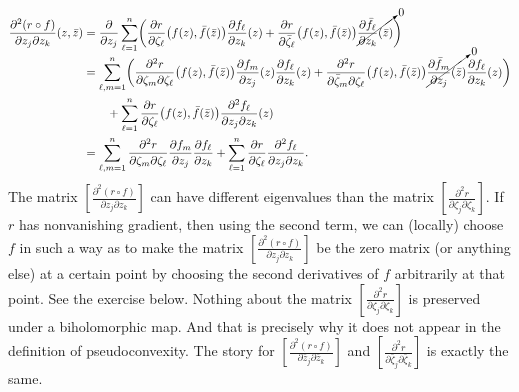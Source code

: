 \documentclass[12pt,openany]{book}
\theoremstyle{plain}
\theoremstyle{remark}
\theoremstyle{definition}
\theoremstyle{exercise}
\theoremstyle{example}
\begin{document}
\begin{equation*} %
\begin{split}
\frac{\partial^2 (r \circ f)}{\partial z_j \partial z_k} (z,\bar{z})
& =
\frac{\partial}{\partial z_j }
\sum_{\ell=1}^n 
\biggl(
\frac{\partial r}{\partial \zeta_\ell} \bigl(f(z),\bar{f}(\bar{z})\bigr)
\frac{\partial f_\ell}{\partial z_k} (z) 
+
\frac{\partial r}{\partial \bar{\zeta}_\ell} \bigl(f(z),\bar{f}(\bar{z})\bigr)
\cancelto{0}{\frac{\partial \bar{f}_\ell}{\partial z_k} (\bar{z})}
\biggr)
\\
& =
\sum_{\ell,m=1}^n 
\biggl(
\frac{\partial^2 r}{\partial \zeta_m \partial \zeta_\ell}
\bigl(f(z),\bar{f}(\bar{z})\bigr)
\frac{\partial f_m}{\partial z_j} (z) 
\frac{\partial f_\ell}{\partial z_k} (z) 
+
\frac{\partial^2 r}{\partial \bar{\zeta}_m \partial \zeta_\ell} \bigl(f(z),\bar{f}(\bar{z})\bigr)
\smash{\cancelto{0}{\frac{\partial \bar{f}_m}{\partial z_j} (\bar{z}) }}
\frac{\partial f_\ell}{\partial z_k} (z) 
\biggr)
\\
& \qquad +
\sum_{\ell=1}^n 
\frac{\partial r}{\partial \zeta_\ell} \bigl(f(z),\bar{f}(\bar{z})\bigr)
\frac{\partial^2 f_\ell}{\partial z_j \partial z_k} (z)
\\
&=
\sum_{\ell,m=1}^n 
\frac{\partial^2 r}{\partial \zeta_m \partial \zeta_\ell}
\frac{\partial f_m}{\partial z_j}
\frac{\partial f_\ell}{\partial z_k}
+
\sum_{\ell=1}^n 
\frac{\partial r}{\partial \zeta_\ell}
\frac{\partial^2 f_\ell}{\partial z_j \partial z_k} .
\end{split}
\end{equation*}
The matrix 
$\left[ \frac{\partial^2 (r \circ f)}{\partial z_j \partial z_k} \right]$
can have different eigenvalues than the matrix
$\left[ \frac{\partial^2 r}{\partial \zeta_j \partial \zeta_k} \right]$.
If $r$ has nonvanishing gradient, then
using the second term, we can (locally) choose $f$ in such a way as to make
the matrix
$\left[ \frac{\partial^2 (r \circ f)}{\partial z_j \partial z_k} \right]$
be the zero matrix (or anything else) at a certain point by choosing the second
derivatives of $f$ arbitrarily at that point.  See the exercise below.  Nothing about the matrix
$\left[ \frac{\partial^2 r}{\partial \zeta_j \partial \zeta_k} \right]$ is
preserved under a biholomorphic map.  And that is precisely why it does not
appear in the definition of pseudoconvexity.
The story for
$\left[ \frac{\partial^2 (r \circ f)}{\partial \bar{z}_j \partial \bar{z}_k} \right]$
and
$\left[ \frac{\partial^2 r}{\partial \bar{\zeta}_j \partial \bar{\zeta}_k} \right]$ is
exactly the same.
\end{document}

